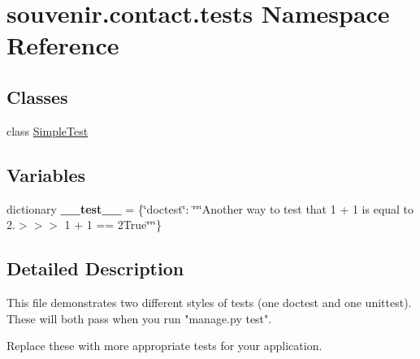 \hypertarget{namespacesouvenir_1_1contact_1_1tests}{\section{souvenir.\-contact.\-tests Namespace Reference}
\label{namespacesouvenir_1_1contact_1_1tests}
}
\subsection*{Classes}
\begin{DoxyCompactItemize}
\item 
class \hyperlink{classsouvenir_1_1contact_1_1tests_1_1SimpleTest}{Simple\-Test}
\end{DoxyCompactItemize}
\subsection*{Variables}
\begin{DoxyCompactItemize}
\item 
\hypertarget{namespacesouvenir_1_1contact_1_1tests_a29befd326d479da62133c23923a8b1b1}{dictionary {\bfseries \-\_\-\-\_\-test\-\_\-\-\_\-} = \{\char`\"{}doctest\char`\"{}\-: \char`\"{}\char`\"{}\char`\"{}Another way to test that 1 + 1 is equal to 2.$>$$>$$>$ 1 + 1 == 2\-True\char`\"{}\char`\"{}\char`\"{}\}}\label{namespacesouvenir_1_1contact_1_1tests_a29befd326d479da62133c23923a8b1b1}

\end{DoxyCompactItemize}


\subsection{Detailed Description}
\begin{DoxyVerb}This file demonstrates two different styles of tests (one doctest and one
unittest). These will both pass when you run "manage.py test".

Replace these with more appropriate tests for your application.
\end{DoxyVerb}
 